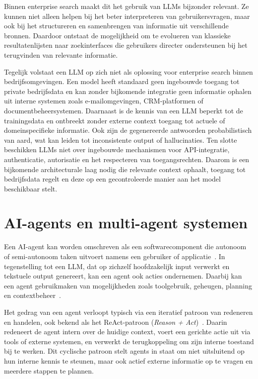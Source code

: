 Binnen enterprise search maakt dit het gebruik van \glspl{LLM} bijzonder relevant. Ze kunnen niet alleen helpen bij het beter interpreteren van gebruikersvragen, maar ook bij het structureren en samenbrengen van informatie uit verschillende bronnen. Daardoor ontstaat de mogelijkheid om te evolueren van klassieke resultatenlijsten naar zoekinterfaces die gebruikers directer ondersteunen bij het terugvinden van relevante informatie.

Tegelijk volstaat een \gls{LLM} op zich niet als oplossing voor enterprise search binnen bedrijfsomgevingen. Een model heeft standaard geen ingebouwde toegang tot private bedrijfsdata en kan zonder bijkomende integratie geen informatie ophalen uit interne systemen zoals e-mailomgevingen, \gls{CRM}-platformen of documentbeheersystemen. Daarnaast is de kennis van een \gls{LLM} beperkt tot de trainingsdata en ontbreekt zonder externe context toegang tot actuele of domeinspecifieke informatie. Ook zijn de gegenereerde antwoorden probabilistisch van aard, wat kan leiden tot inconsistente output of hallucinaties. Ten slotte beschikken \glspl{LLM} niet over ingebouwde mechanismen voor \gls{API}-integratie, authenticatie, autorisatie en het respecteren van toegangsrechten. Daarom is een bijkomende architecturale laag nodig die relevante context ophaalt, toegang tot bedrijfsdata regelt en deze op een gecontroleerde manier aan het model beschikbaar stelt.


\section{AI-agents en multi-agent systemen}
\label{sec:agents}

Een \gls{AI}-agent kan worden omschreven als een softwarecomponent die autonoom of semi-autonoom taken uitvoert namens een gebruiker of applicatie~\cite{openai2025agents}. In tegenstelling tot een \gls{LLM}, dat op zichzelf hoofdzakelijk input verwerkt en tekstuele output genereert, kan een agent ook acties ondernemen. Daarbij kan een agent gebruikmaken van mogelijkheden zoals toolgebruik, geheugen, planning en contextbeheer~\cite{googlecloud2024agents}.

Het gedrag van een agent verloopt typisch via een iteratief patroon van redeneren en handelen, ook bekend als het ReAct-patroon (\textit{Reason + Act})~\cite{yao2022react}. Daarin redeneert de agent intern over de huidige context, voert een gerichte actie uit via tools of externe systemen, en verwerkt de terugkoppeling om zijn interne toestand bij te werken. Dit cyclische patroon stelt agents in staat om niet uitsluitend op hun interne kennis te steunen, maar ook actief externe informatie op te vragen en meerdere stappen te plannen.


